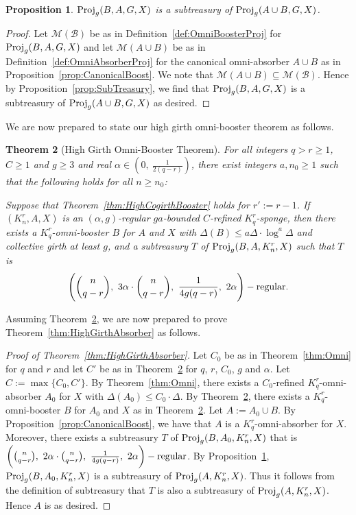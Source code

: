\documentclass[11pt]{article}
\newcommand{\mc}[1]{\mathcal{#1}}
\newcounter{i}
\theoremstyle{plain}
\newtheorem{thm}{Theorem}[section]
\newtheorem{proposition}[thm]{Proposition}
\theoremstyle{plain} %
\theoremstyle{definition}
\begin{document}
\begin{proposition}\label{prop:BoosterSubTreasury}
${\rm Proj}_g(B,A,G,X)$ is a subtreasury of ${\rm Proj}_g(A\cup B,G,X)$.
\end{proposition}
\begin{proof}
Let $\mathcal{M}(\mc{B})$ be as in Definition~\ref{def:OmniBoosterProj} for ${\rm Proj}_g(B,A,G,X)$ and let $\mathcal{M}(A\cup B)$ be as in Definition~\ref{def:OmniAbsorberProj} for the canonical omni-absorber $A\cup B$ as in Proposition~\ref{prop:CanonicalBoost}. We note that $\mathcal{M}(A\cup B)\subseteq \mathcal{M}(\mc{B})$. Hence by Proposition~\ref{prop:SubTreasury}, we find that ${\rm Proj}_g(B,A,G,X)$ is a subtreasury of ${\rm Proj}_g(A\cup B,G,X)$ as desired. 
\end{proof}


We are now prepared to state our high girth omni-booster theorem as follows.

\begin{thm}[High Girth Omni-Booster Theorem]\label{thm:HighGirthOmniBooster}
For all integers $q>r\ge 1$, $C\ge 1$ and $g\ge 3$ and real $\alpha \in \left(0,~\frac{1}{2(q-r)}\right)$, there exist integers $a,n_0\ge 1$ such that the following holds for all $n\ge n_0$: 

Suppose that Theorem~\ref{thm:HighCogirthBooster} holds for $r':=r-1$. If $(K_n^r, A, X)$ is an $(\alpha,g)$-regular $ga$-bounded $C$-refined $K_q^r$-sponge, then there exists a $K_q^r$-omni-booster $B$ for $A$ and $X$ with $\Delta(B)\le a\Delta\cdot \log^{a} \Delta$ and collective girth at least $g$, and a subtreasury $T$ of ${\rm Proj}_g(B,A,K_n^r,X)$ such that $T$ is 
$$\Bigg(\binom{n}{q-r},~3\alpha \cdot \binom{n}{q-r},~\frac{1}{4g(q-r)},~2\alpha\Bigg)-{\rm regular}.$$
\end{thm}

Assuming Theorem~\ref{thm:HighGirthOmniBooster}, we are now prepared to prove Theorem~\ref{thm:HighGirthAbsorber} as follows.

\begin{proof}[Proof of Theorem~\ref{thm:HighGirthAbsorber}]
Let $C_0$ be as in Theorem~\ref{thm:Omni} for $q$ and $r$ and let $C'$ be as in Theorem~\ref{thm:HighGirthOmniBooster} for $q$, $r$, $C_0$, $g$ and $\alpha$. Let $C:= \max\{C_0,C'\}$. By Theorem~\ref{thm:Omni}, there exists a $C_0$-refined $K_q^r$-omni-absorber $A_0$ for $X$ with $\Delta(A_0)\le C_0 \cdot \Delta$. By Theorem~\ref{thm:HighGirthOmniBooster}, there exists a $K_q^r$-omni-booster $B$ for $A_0$ and $X$ as in Theorem~\ref{thm:HighGirthOmniBooster}. Let $A:= A_0\cup B$. By Proposition~\ref{prop:CanonicalBoost}, we have that $A$ is a $K_q^r$-omni-absorber for $X$. Moreover, there exists a subtreasury $T$ of ${\rm Proj}_g(B,A_0,K_n^r,X)$ that is $\bigg(\binom{n}{q-r},~2\alpha \cdot \binom{n}{q-r},~\frac{1}{4g(q-r)},~2\alpha\bigg)-{\rm regular}$. By Proposition~\ref{prop:BoosterSubTreasury}, ${\rm Proj}_g(B,A_0,K_n^r,X)$ is a subtreasury of ${\rm Proj}_g(A,K_n^r,X)$. Thus it follows from the definition of subtreasury that $T$ is also a subtreasury of ${\rm Proj}_g(A,K_n^r,X)$. Hence $A$ is as desired.
\end{proof}
\end{document}
